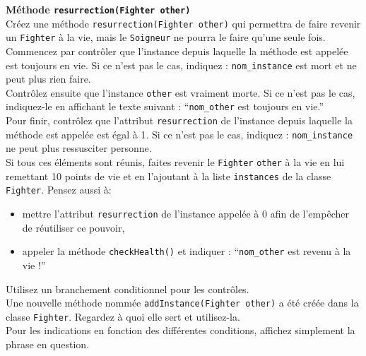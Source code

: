 \begin{Exercice}[15 minutes] \textbf{Méthode \lstinline{resurrection(Fighter other)}} \\
Créez une méthode \lstinline{resurrection(Fighter other)} qui permettra de faire revenir un \lstinline{Fighter} à la vie, mais le \lstinline{Soigneur} ne pourra le faire qu'une seule fois. \\

Commencez par contrôler que l'instance depuis laquelle la méthode est appelée est toujours en vie. Si ce n'est pas le cas, indiquez : \lstinline{nom_instance} est mort et ne peut plus rien faire.  \\

Contrôlez ensuite que l'instance \lstinline{other} est vraiment morte. Si ce n'est pas le cas, indiquez-le en affichant le texte suivant : ``\lstinline{nom_other} est toujours en vie.'' \\

Pour finir, contrôlez que l'attribut \lstinline{resurrection} de l'instance depuis laquelle la méthode est appelée est égal à 1. Si ce n'est pas le cas, indiquez : \lstinline{nom_instance} ne peut plus ressusciter personne.\\

Si tous ces éléments sont réunis, faites revenir le \lstinline{Fighter} \lstinline{other} à la vie en lui remettant 10 points de vie et en l'ajoutant à la liste \lstinline{instances} de la classe \lstinline{Fighter}. Pensez aussi à:

\begin{itemize}
	\item mettre l'attribut \lstinline{resurrection} de l'instance appelée à 0 afin de l'empêcher de réutiliser ce pouvoir,
	\item appeler la méthode \lstinline{checkHealth()} et indiquer : ``\lstinline{nom_other} est revenu à la vie !''
\end{itemize}

\begin{conseil}
Utilisez un branchement conditionnel pour les contrôles. \\

Une nouvelle méthode nommée \lstinline{addInstance(Fighter other)} a été créée dans la classe \lstinline{Fighter}. Regardez à quoi elle sert et utilisez-la. \\

Pour les indications en fonction des différentes conditions, affichez simplement la phrase en question. \\
\end{conseil}

\begin{solution}
	
\end{solution}

\end{Exercice}

